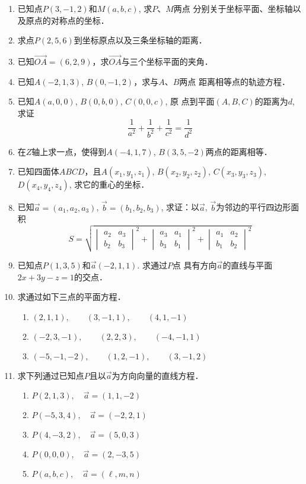 \begin{enumerate}
\item 已知点$P(3,-1,2)$和$M(a,b,c)$, 求$P$、$M$两点
分别关于坐标平面、坐标轴以及原点的对称点的坐标．
\item 求点$P(2,5,6)$到坐标原点以及三条坐标轴的距离．
\item 已知$\Vec{OA}=(6,2,9)$，求$\Vec{OA}$与三个坐标平面的夹角．
\item 已知$A(-2,1,3)$, $B(0,-1,2)$，求与$A$、$B$两点
距离相等点的轨迹方程．
\item 已知$A(a,0,0)$, $B(0,b,0)$, $C(0,0,c)$, 原
点到平面$(A,B,C)$的距离为$d$, 求证
\[\frac{1}{a^2}+\frac{1}{b^2}+\frac{1}{c^2}=\frac{1}{d^2}\]
\item 在$Z$轴上求一点，使得到$A(-4,1,7)$, $B(3,5,-2)$两点的距离相等．
\item 已知四面体$ABCD$，且$A(x_1,y_1,z_1)$, $B(x_2,
y_2,z_2)$, $C(x_3,y_3, z_3)$, $D(x_4, y_4,z_4)$, 
求它的重心的坐标．
\item 已知$\vec{a}=(a_1,a_2,a_3)$, $\vec{b}=(b_1,b_2,b_3)$, 求证：以$\vec{a}$, $\vec{b}$为邻边的平行四边形面积
\[S=\sqrt{\begin{vmatrix}
    a_2&a_3\\b_2&b_3
\end{vmatrix}^2+\begin{vmatrix}
    a_3&a_1\\b_3&b_1
\end{vmatrix}^2+\begin{vmatrix}
    a_1&a_2\\b_1&b_2
\end{vmatrix}^2}\]

\item 已知点$P(1,3,5)$和$\vec{a}(-2,1,1)$. 求通过$P$点
具有方向$\vec{a}$的直线与平面$2x+3y-z=1$的交点．

\item 求通过如下三点的平面方程．
\begin{enumerate}
    \item $(2,1,1),\qquad (3,-1,1),\qquad (4,1,-1)$
    \item $(-2,3,-1),\qquad (2,2,3),\qquad (-4,-1,1)$
    \item $(-5,-1,-2),\qquad (1,2,-1),\qquad (3,-1,2)$
\end{enumerate}

\item 求下列通过已知点$P$且以$\vec{a}$为方向向量的直线方程．
\begin{multicols}{2}
    \begin{enumerate}
    \item $P(2,1,3),\quad \vec{a}=(1,1,-2)$
    \item $P(-5,3,4),\quad \vec{a}=(-2,2,1)$
    \item $P(4,-3,2),\quad \vec{a}=(5,0,3)$
    \item $P(0,0,0),\quad \vec{a}=(2,-3,5)$
    \item $P(a,b,c),\quad \vec{a}=(\ell,m,n)$
\end{enumerate}
\end{multicols}

\end{enumerate}

